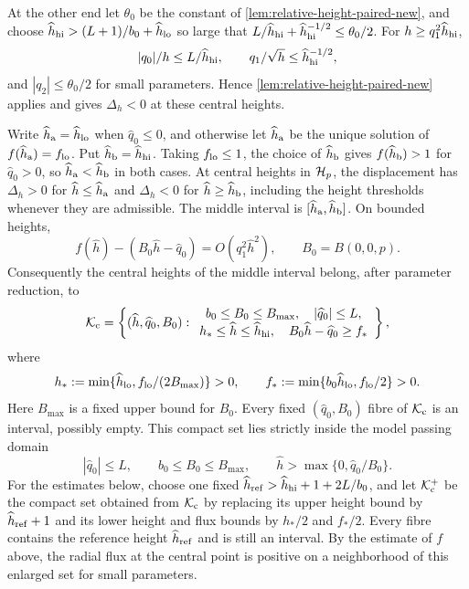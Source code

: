 At the other end let \(\theta_0\) be the constant of
\cref{lem:relative-height-paired-new}, and choose
\(\widehat h_{\rm hi}>(L+1)/b_0+\widehat h_{\rm lo}\) so large that
\(L/\widehat h_{\rm hi}+\widehat h_{\rm hi}^{-1/2}\le\theta_0/2\).
For \(h\ge q_1^2\widehat h_{\rm hi}\),
\[
 |q_0|/h\le L/\widehat h_{\rm hi},\qquad
 q_1/\sqrt h\le \widehat h_{\rm hi}^{-1/2},
\]
and \(|q_2|\le\theta_0/2\) for small parameters. Hence
\cref{lem:relative-height-paired-new} applies and gives
\(\Delta_h<0\) at these central heights.

Write \(\widehat h_{\rm a}=\widehat h_{\rm lo}\) when \(\widehat q_0\le0\), and otherwise
let \(\widehat h_{\rm a}\) be the unique solution of \(f(\widehat h_{\rm a})=f_{\rm lo}\).
Put \(\widehat h_{\rm b}=\widehat h_{\rm hi}\). Taking \(f_{\rm lo}\le1\), the choice
of \(\widehat h_{\rm b}\) gives \(f(\widehat h_{\rm b})>1\) for \(\widehat q_0>0\), so \(\widehat h_{\rm a}<\widehat h_{\rm b}\) in both
cases. At central heights in \(\mathcal H_p\), the displacement has
\(\Delta_h>0\) for \(\widehat h\le \widehat h_{\rm a}\) and \(\Delta_h<0\) for
\(\widehat h\ge \widehat h_{\rm b}\), including the height thresholds whenever they
are admissible.
The middle interval is \([\widehat h_{\rm a},\widehat h_{\rm b}]\). On bounded heights,
\[
 f(\widehat h)-(B_0\widehat h-\widehat q_0)
       =O(q_1^2\widehat h^2),\qquad B_0=B(0,0,p).
\]
Consequently the central heights of the middle interval belong, after
parameter reduction, to
\begin{equation}
\label{eq:direct-contact-compact-passing}
 \mathcal K_{\rm c}=\left\{(\widehat h,\widehat q_0,B_0):
 \begin{array}{c}
 b_0\le B_0\le B_{\max},\quad |\widehat q_0|\le L,\\
 h_*\le\widehat h\le\widehat h_{\rm hi},\quad
 B_0\widehat h-\widehat q_0\ge f_*
 \end{array}\right\},
\end{equation}
where
\[
 h_*:=\min\{\widehat h_{\rm lo},f_{\rm lo}/(2B_{\max})\}>0,
 \qquad f_*:=\min\{b_0\widehat h_{\rm lo},f_{\rm lo}/2\}>0.
\]
Here \(B_{\max}\) is a fixed upper bound for \(B_0\).
Every fixed \((\widehat q_0,B_0)\) fibre of \(\mathcal K_{\rm c}\) is an interval,
possibly empty. This compact set lies strictly inside the model passing domain
\begin{equation}
\label{eq:direct-contact-model-domain}
 |\widehat q_0|\le L,\qquad b_0\le B_0\le B_{\max},\qquad
 \widehat h>\max\{0,\widehat q_0/B_0\}.
\end{equation}
For the estimates below, choose one fixed
\(\widehat h_{\rm ref}>\widehat h_{\rm hi}+1+2L/b_0\),
and let $\mathcal K_{\rm c}^+$ be the compact set obtained from $\mathcal K_{\rm c}$
by replacing its upper height bound by $\widehat h_{\rm ref}+1$
and its lower height and flux bounds by $h_*/2$ and $f_*/2$.
Every fibre contains the reference height $\widehat h_{\rm ref}$ and
is still an interval. By the estimate of \(f\) above, the radial flux
at the central point is positive on a neighborhood of this enlarged
set for small parameters.

